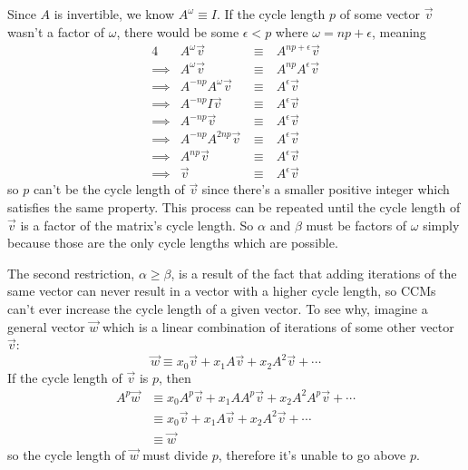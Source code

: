 \documentclass[a4paper, 12pt, reqno]{amsart}
\begin{document}
	Since $A$ is invertible, we know $A^{\omega} \equiv I$. If the cycle length $p$ of some vector $\vec{v}$ wasn't a factor of $\omega$, there would be some $\epsilon < p$ 
	where $\omega = np + \epsilon$, meaning
	\begin{alignat*}{4}
		         & A^{\omega}\vec{v}        \  & \equiv & \ A^{np + \epsilon}\vec{v}  \\
		\implies & A^{\omega}\vec{v}        \  & \equiv & \ A^{np}A^{\epsilon}\vec{v} \\
		\implies & A^{-np}A^{\omega}\vec{v} \  & \equiv & \ A^{\epsilon}\vec{v}       \\
		\implies & A^{-np}I\vec{v}          \  & \equiv & \ A^{\epsilon}\vec{v}       \\
		\implies & A^{-np}\vec{v}           \  & \equiv & \ A^{\epsilon}\vec{v}       \\
		\implies & A^{-np}A^{2np}\vec{v}    \  & \equiv & \ A^{\epsilon}\vec{v}       \\
		\implies & A^{np}\vec{v}            \  & \equiv & \ A^{\epsilon}\vec{v}       \\
		\implies & \vec{v}                  \  & \equiv & \ A^{\epsilon}\vec{v}
	\end{alignat*}
	so $p$ can't be the cycle length of $\vec{v}$ since there's a smaller positive integer which satisfies the same property. This process can be repeated until the cycle
	length of $\vec{v}$ is a factor of the matrix's cycle length. So $\alpha$ and $\beta$ must be factors of $\omega$ simply because those are the only cycle lengths which
	are possible.
	
	The second restriction, $\alpha \geq \beta$, is a result of the fact that adding iterations of the same vector can never result in a vector with a higher cycle length,
	so CCMs can't ever increase the cycle length of a given vector. To see why, imagine a general vector $\vec{w}$ which is a linear combination of iterations of some
	other vector $\vec{v}$:
	\[
		\vec{w} \equiv x_{0}\vec{v} + x_{1}A\vec{v} + x_{2}A^{2}\vec{v} + \cdots
	\]
	If the cycle length of $\vec{v}$ is $p$, then
	\begin{align*}
		A^{p}\vec{w} & \equiv x_{0}A^{p}\vec{v} + x_{1}AA^{p}\vec{v} + x_{2}A^{2}A^{p}\vec{v} + \cdots \\
		             & \equiv x_{0}\vec{v} + x_{1}A\vec{v} + x_{2}A^{2}\vec{v} + \cdots                \\
					 & \equiv \vec{w}
	\end{align*}
	so the cycle length of $\vec{w}$ must divide $p$, therefore it's unable to go above $p$.
	
\end{document}
